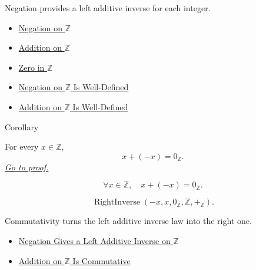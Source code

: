\begin{remark*}[Interpretation]
Negation provides a left additive inverse for each integer.
\end{remark*}

\begin{dependencies}
\begin{itemize}
  \item \hyperref[def:negation-on-z-classes]{Negation on $\mathbb{Z}$}
  \item \hyperref[def:addition-on-z-classes]{Addition on $\mathbb{Z}$}
  \item \hyperref[def:zero-in-z]{Zero in $\mathbb{Z}$}
  \item \hyperref[thm:negation-on-z-well-defined]{Negation on $\mathbb{Z}$ Is Well-Defined}
  \item \hyperref[thm:addition-on-z-well-defined]{Addition on $\mathbb{Z}$ Is Well-Defined}
\end{itemize}
\end{dependencies}

\begin{corollarybox}{Corollary}
\begin{corollary}
\label{cor:negation-right-additive-inverse-on-z}
For every $x\in\mathbb{Z}$,
\[
x+(-x)=0_{\mathbb{Z}}.
\]
\hyperref[prf:negation-right-additive-inverse-on-z]{\textit{Go to proof.}}
\end{corollary}
\end{corollarybox}

\begin{remark*}
\[
\forall x\in\mathbb{Z},\quad x+(-x)=0_{\mathbb{Z}}.
\]
\end{remark*}

\begin{remark*}
\[
\operatorname{RightInverse}(-x,x,0_{\mathbb{Z}},\mathbb{Z},+_{\mathbb{Z}}).
\]
\end{remark*}

\begin{remark*}[Interpretation]
Commutativity turns the left additive inverse law into the right one.
\end{remark*}

\begin{dependencies}
\begin{itemize}
  \item \hyperref[thm:negation-left-additive-inverse-on-z]{Negation Gives a Left Additive Inverse on $\mathbb{Z}$}
  \item \hyperref[thm:addition-on-z-commutative]{Addition on $\mathbb{Z}$ Is Commutative}
\end{itemize}
\end{dependencies}

